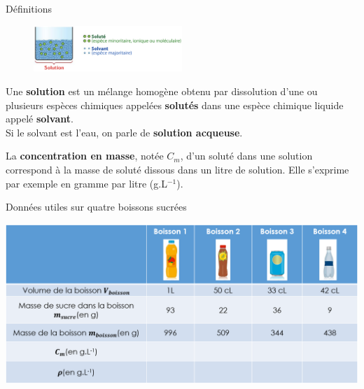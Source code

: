 
\begin{doc}{Définitions}
\begin{tcolorbox}[colback=green!5!white,colframe=green!75!black,title=\textbf{Solution, soluté et solvant}]

\begin{figure}
\vspace{-0.6cm}
    \centering
      \includegraphics[width=0.5\textwidth]{Images/Activite/Chap2/Solution_solvant.png}
  \end{figure}
  Une \textbf{solution} est un mélange homogène obtenu par dissolution d’une ou plusieurs espèces chimiques appelées \textbf{solutés} dans une espèce chimique liquide appelé \textbf{solvant}.\\

  Si le solvant est l'eau, on parle de \textbf{solution acqueuse}.
\end{tcolorbox}
\begin{tcolorbox}[colback=green!5!white,colframe=green!75!black,title=\textbf{Concentration en masse}]
La \textbf{concentration en masse}, notée $C_m$,  d’un soluté dans une solution correspond à la masse de soluté dissous dans un litre de solution. Elle s’exprime par exemple en gramme par litre (g.L$^{-1}$).

\end{tcolorbox}

\end{doc}
\newpage
\begin{doc}{Données utiles sur quatre boissons sucrées}
\begin{center}
    \includegraphics[scale=0.5]{Images/Activite/Chap2/Donnees.png}
\end{center}
\end{doc}

